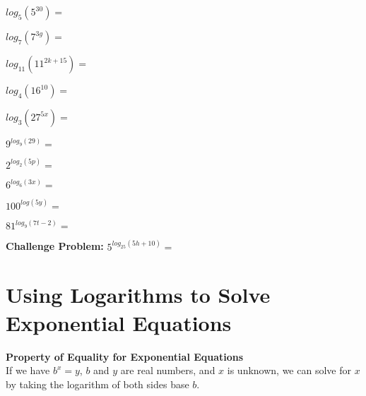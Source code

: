 \documentclass[12pt]{article}
\begin{document}
\begin{enumerate}
	\setlength\itemsep{1.3cm}
\begin{multicols}{2}
	
	\item $log_{5} \left( 5^{30} \right) =$\\

	\item $log_{7} \left( 7^{3g} \right) =$\\
	
	\item $log_{11} \left( 11^{2k+15} \right) = $\\
		
	\item $log_{4} \left( 16^{10} \right) =$\\
	
	\item $log_{3} \left( 27^{5x} \right) =$\\
	
	\item $9^{log_{9}(29)}=$\\
	
	\item $2^{log_{2}(5p)}=$\\
	
	\item $6^{log_{6}(3x)}=$\\
	
	\item $100^{log(5y)}=$\\
	
	\item $81^{log_{9}(7t-2)}=$\\	

\end{multicols}
\end{enumerate}
\vspace{.75cm}
\textbf{Challenge Problem:} $5^{log_{25}(5h+10)}=$

\section{Using Logarithms to Solve Exponential Equations}

\textbf{Property of Equality for Exponential Equations}\\

If we have $b^x=y$, $b$ and $y$ are real numbers, and $x$ is unknown, we can solve for $x$ by taking the logarithm of both sides base $b$.\\
\end{document}
